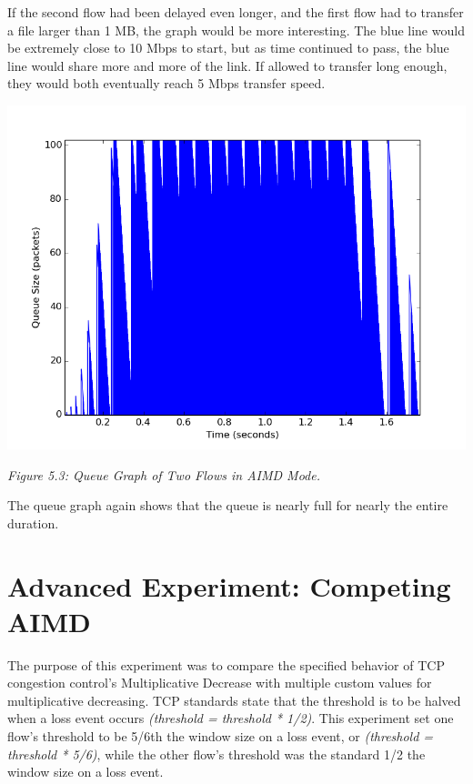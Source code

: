 \documentclass[11pt]{article}
\begin{document}
If the second flow had been delayed even longer, and the first flow had to transfer a file larger than 1 MB, the graph would be more interesting. The blue line would be extremely close to 10 Mbps to start, but as time continued to pass, the blue line would share more and more of the link. If allowed to transfer long enough, they would both eventually reach 5 Mbps transfer speed.


\includegraphics[width=17cm]{outputs/AIMD/AIMD_queue.png}

\centerline{\emph{Figure 5.3: Queue Graph of Two Flows in AIMD Mode.}}

The queue graph again shows that the queue is nearly full for nearly the entire duration.




\section{Advanced Experiment: Competing AIMD}

The purpose of this experiment was to compare the specified behavior of TCP congestion control's Multiplicative Decrease with multiple custom values for multiplicative decreasing. TCP standards state that the threshold is to be halved when a loss event occurs \emph{(threshold = threshold * 1/2)}. This experiment set one flow's threshold to be 5/6th the window size on a loss event, or \emph{(threshold = threshold * 5/6)}, while the other flow's threshold was the standard 1/2 the window size on a loss event.
\end{document}
